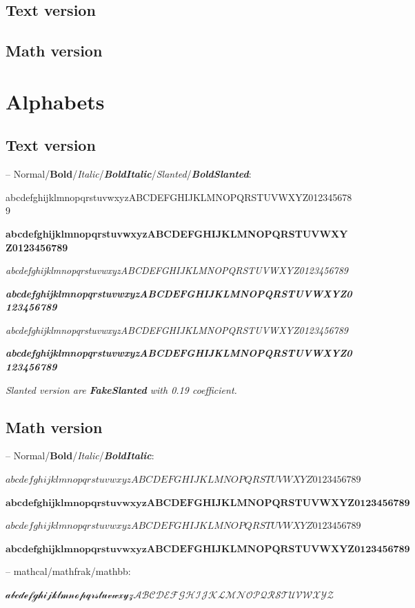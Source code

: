 \documentclass[a4paper]{scrartcl}
\newcommand{\abc}{abcdefghijklmnopqrstuvwxyz}
\newcommand{\ABC}{ABCDEFGHIJKLMNOPQRSTUVWXYZ}
\newcommand{\samplenumbers}{0123456789}
\begin{document}
\subsection{Text version}


\subsection{Math version}


\section{Alphabets}

\subsection{Text version}

-- Normal/\textbf{Bold}/\textit{Italic}/\textit{\textbf{BoldItalic}}/\textsl{Slanted}/\textsl{\textbf{BoldSlanted}}:

\abc\ABC\samplenumbers

\textbf{\abc\ABC\samplenumbers}

\textit{\abc\ABC\samplenumbers}

\textit{\textbf{\abc\ABC\samplenumbers}}

\textsl{\abc\ABC\samplenumbers}

\textsl{\textbf{\abc\ABC\samplenumbers}}

\smallskip

\textit{Slanted version are \textbf{FakeSlanted} with 0.19 coefficient.}

\subsection{Math version}

-- Normal/\textbf{Bold}/\textit{Italic}/\textit{\textbf{BoldItalic}}:

$\abc\ABC\samplenumbers$

$\mathbf{\abc\ABC\samplenumbers}$

$\mathit{\abc\ABC\samplenumbers}$

$\mathit{\mathbf{\abc\ABC\samplenumbers}}$

\smallskip

-- mathcal/mathfrak/mathbb:

$\mathcal{\abc\ABC}$
\end{document}
